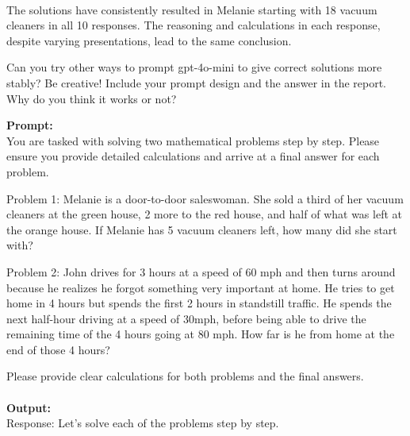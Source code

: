 \documentclass[11pt,addpoints,answers]{exam}
\begin{document}
\begin{questions}
    \begin{tcolorbox}[fit,height=10cm, width=16cm, blank, borderline={1pt}{-2pt},nobeforeafter,breakable]
    \\

    The solutions have consistently resulted in Melanie starting with 18 vacuum cleaners in all 10 responses. The reasoning and calculations in each response, despite varying presentations, lead to the same conclusion.

    \end{tcolorbox}

    
    \clearpage
    \question[10] Can you try other ways to prompt gpt-4o-mini to give correct solutions more stably? Be creative! Include your prompt design and the answer in the report. Why do you think it works or not?

    \begin{tcolorbox}[fit,height=22cm, width=16cm, blank, borderline={1pt}{-2pt},nobeforeafter,breakable]
    \textbf{Prompt:}\\
    You are tasked with solving two mathematical problems step by step. Please ensure you provide detailed calculations and arrive at a final answer for each problem. 
    
    Problem 1:
    Melanie is a door-to-door saleswoman. She sold a third of her vacuum cleaners at the green house, 2 more to the red house, and half of what was left at the orange house. If Melanie has 5 vacuum cleaners left, how many did she start with?

    Problem 2:
    John drives for 3 hours at a speed of 60 mph and then turns around because he realizes he forgot something very important at home. He tries to get home in 4 hours but spends the first 2 hours in standstill traffic. He spends the next half-hour driving at a speed of 30mph, before being able to drive the remaining time of the 4 hours going at 80 mph. How far is he from home at the end of those 4 hours?

    Please provide clear calculations for both problems and the final answers.
    \\\\
    \textbf{Output:}\\
    Response:  Let’s solve each of the problems step by step.


\end{tcolorbox}
\end{questions}
\end{document}
